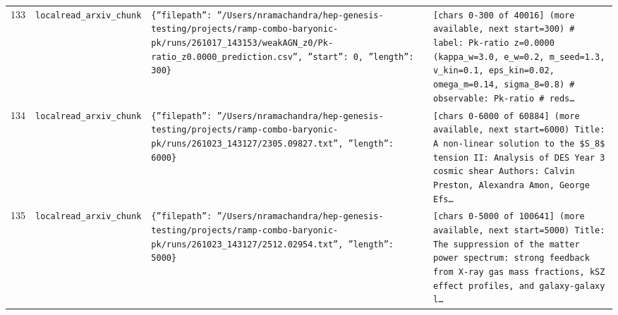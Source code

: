 \documentclass[11pt,a4paper]{article}
\begin{document}
\begin{longtable}{@{}p{}p{}p{}p{}@{}}
133 & \texttt{local}\newline\texttt{read\_\allowbreak{}arxiv\_\allowbreak{}chunk} & \texttt{\{''filepath'':\allowbreak{} ''/\allowbreak{}Users/\allowbreak{}nramachandra/\allowbreak{}hep-genesis-testing/\allowbreak{}projects/\allowbreak{}ramp-combo-baryonic-pk/\allowbreak{}runs/\allowbreak{}261017\_\allowbreak{}143153/\allowbreak{}weakAGN\_\allowbreak{}z0/\allowbreak{}Pk-ratio\_\allowbreak{}z0.0000\_\allowbreak{}prediction.csv'',\allowbreak{} ''start'':\allowbreak{} 0,\allowbreak{} ''length'':\allowbreak{} 300\}\allowbreak{}} & \texttt{[chars 0-300 of 40016]\allowbreak{} (more available,\allowbreak{} next start=\allowbreak{}300)\allowbreak{}  \# label:\allowbreak{} Pk-ratio z=\allowbreak{}0.0000 (kappa\_\allowbreak{}w=\allowbreak{}3.0,\allowbreak{} e\_\allowbreak{}w=\allowbreak{}0.2,\allowbreak{} m\_\allowbreak{}seed=\allowbreak{}1.3,\allowbreak{} v\_\allowbreak{}kin=\allowbreak{}0.1,\allowbreak{} eps\_\allowbreak{}kin=\allowbreak{}0.02,\allowbreak{} omega\_\allowbreak{}m=\allowbreak{}0.14,\allowbreak{} sigma\_\allowbreak{}8=\allowbreak{}0.8)\allowbreak{} \# observable:\allowbreak{} Pk-ratio \# reds\ldots{}\allowbreak{}} \\
134 & \texttt{local}\newline\texttt{read\_\allowbreak{}arxiv\_\allowbreak{}chunk} & \texttt{\{''filepath'':\allowbreak{} ''/\allowbreak{}Users/\allowbreak{}nramachandra/\allowbreak{}hep-genesis-testing/\allowbreak{}projects/\allowbreak{}ramp-combo-baryonic-pk/\allowbreak{}runs/\allowbreak{}261023\_\allowbreak{}143127/\allowbreak{}2305.09827.txt'',\allowbreak{} ''length'':\allowbreak{} 6000\}\allowbreak{}} & \texttt{[chars 0-6000 of 60884]\allowbreak{} (more available,\allowbreak{} next start=\allowbreak{}6000)\allowbreak{}  Title:\allowbreak{} A non-linear solution to the \$S\_\allowbreak{}8\$ tension II:\allowbreak{} Analysis of DES Year 3 cosmic shear Authors:\allowbreak{} Calvin Preston,\allowbreak{} Alexandra Amon,\allowbreak{} George Efs\ldots{}\allowbreak{}} \\
135 & \texttt{local}\newline\texttt{read\_\allowbreak{}arxiv\_\allowbreak{}chunk} & \texttt{\{''filepath'':\allowbreak{} ''/\allowbreak{}Users/\allowbreak{}nramachandra/\allowbreak{}hep-genesis-testing/\allowbreak{}projects/\allowbreak{}ramp-combo-baryonic-pk/\allowbreak{}runs/\allowbreak{}261023\_\allowbreak{}143127/\allowbreak{}2512.02954.txt'',\allowbreak{} ''length'':\allowbreak{} 5000\}\allowbreak{}} & \texttt{[chars 0-5000 of 100641]\allowbreak{} (more available,\allowbreak{} next start=\allowbreak{}5000)\allowbreak{}  Title:\allowbreak{} The suppression of the matter power spectrum:\allowbreak{} strong feedback from X-ray gas mass fractions,\allowbreak{} kSZ effect profiles,\allowbreak{} and galaxy-galaxy l\ldots{}\allowbreak{}} \\

\end{longtable}
\end{document}
